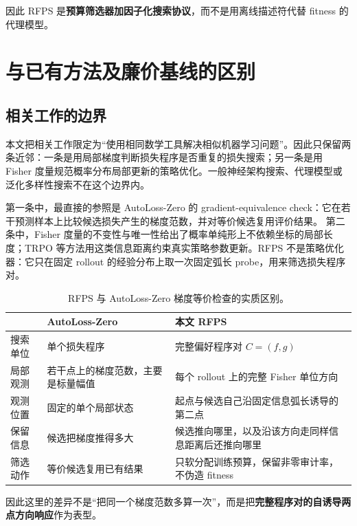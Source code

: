 \documentclass[UTF8,11pt]{ctexart}
\newcommand{\RFPS}{\textsc{RFPS}}
\begin{document}
因此 \RFPS{} 是\textbf{预算筛选器加因子化搜索协议}，而不是用离线描述符代替 fitness 的代理模型。

\section{与已有方法及廉价基线的区别}

\subsection{相关工作的边界}

本文把相关工作限定为“使用相同数学工具解决相似机器学习问题”。因此只保留两条近邻：一条是用局部梯度判断损失程序是否重复的损失搜索；另一条是用 Fisher 度量规范概率分布局部更新的策略优化。一般神经架构搜索、代理模型或泛化多样性搜索不在这个边界内。

第一条中，最直接的参照是 AutoLoss-Zero 的 gradient-equivalence check：它在若干预测样本上比较候选损失产生的梯度范数，并对等价候选复用评价结果\cite{Li_2022_CVPR}。
第二条中，Fisher 度量的不变性与唯一性给出了概率单纯形上不依赖坐标的局部长度\cite{Le_2013_FisherUnique}；TRPO 等方法用这类信息距离约束真实策略参数更新\cite{Schulman_2015_TRPO}。RFPS 不是策略优化器：它只在固定 rollout 的经验分布上取一次固定弧长 probe，用来筛选损失程序对。

\begin{table}[h]
\centering
\small
\caption{RFPS 与 AutoLoss-Zero 梯度等价检查的实质区别。}
\label{tab:autoloss}
\begin{tabularx}{\textwidth}{p{}XX}
\toprule
 & \textbf{AutoLoss-Zero} & \textbf{本文 RFPS}\\
\midrule
搜索单位 & 单个损失程序 & 完整偏好程序对 $C=(f,g)$\\
局部观测 & 若干点上的梯度范数，主要是标量幅值 & 每个 rollout 上的完整 Fisher 单位方向\\
观测位置 & 固定的单个局部状态 & 起点与候选自己沿固定信息弧长诱导的第二点\\
保留信息 & 候选把梯度推得多大 & 候选推向哪里，以及沿该方向走同样信息距离后还推向哪里\\
筛选动作 & 等价候选复用已有结果 & 只软分配训练预算，保留非零审计率，不伪造 fitness\\
\bottomrule
\end{tabularx}
\end{table}

因此这里的差异不是“把同一个梯度范数多算一次”，而是把\textbf{完整程序对的自诱导两点方向响应}作为表型。
\end{document}
